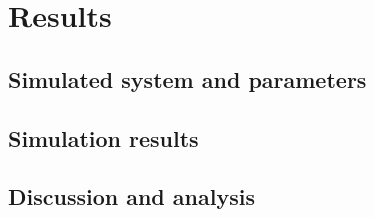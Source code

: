 \section{Results}


\subsection{Simulated system and parameters}

\subsection{Simulation results}

\subsection{Discussion and analysis}
